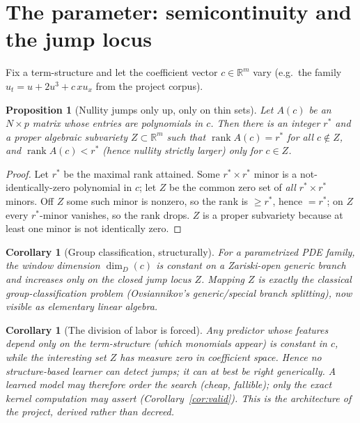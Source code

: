 \documentclass[11pt]{article}
\theoremstyle{plain}
\newtheorem{proposition}[theorem]{Proposition}
\newtheorem{corollary}[theorem]{Corollary}
\theoremstyle{definition}
\theoremstyle{remark}
\newcommand{\R}{\mathbb{R}}
\begin{document}
\section{The parameter: semicontinuity and the jump locus}\label{sec:param}

Fix a term-structure and let the coefficient vector $c\in\R^m$ vary (e.g.\ the family
$u_t=u+2u^3+c\,xu_x$ from the project corpus).

\begin{proposition}[Nullity jumps only up, only on thin sets]\label{prop:semi}
Let $A(c)$ be an $N\times p$ matrix whose entries are polynomials in $c$. Then there is an integer
$r^\ast$ and a proper algebraic subvariety $Z\subset\R^m$ such that
$\operatorname{rank}A(c)=r^\ast$ for all $c\notin Z$, and $\operatorname{rank}A(c)<r^\ast$ (hence
nullity \emph{strictly larger}) only for $c\in Z$.
\end{proposition}

\begin{proof}
Let $r^\ast$ be the maximal rank attained. Some $r^\ast\times r^\ast$ minor is a not-identically-zero
polynomial in $c$; let $Z$ be the common zero set of \emph{all} $r^\ast\times r^\ast$ minors. Off
$Z$ some such minor is nonzero, so the rank is $\ge r^\ast$, hence $=r^\ast$; on $Z$ every
$r^\ast$-minor vanishes, so the rank drops. $Z$ is a proper subvariety because at least one minor is
not identically zero.
\end{proof}

\begin{corollary}[Group classification, structurally]\label{cor:classification}
For a parametrized PDE family, the window dimension $\dim_D(c)$ is constant on a Zariski-open
\emph{generic branch} and increases only on the closed \emph{jump locus} $Z$. Mapping $Z$ is
exactly the classical group-classification problem (Ovsiannikov's generic/special branch splitting),
now visible as elementary linear algebra.
\end{corollary}

\begin{corollary}[The division of labor is forced]\label{cor:division}
Any predictor whose features depend only on the term-\emph{structure} (which monomials appear) is
constant in $c$, while the interesting set $Z$ has measure zero in coefficient space. Hence no
structure-based learner can detect jumps; it can at best be right generically. A learned model may
therefore \emph{order} the search (cheap, fallible); only the exact kernel computation may
\emph{assert} (Corollary~\ref{cor:valid}). This is the architecture of the project, derived rather
than decreed.
\end{corollary}
\end{document}
